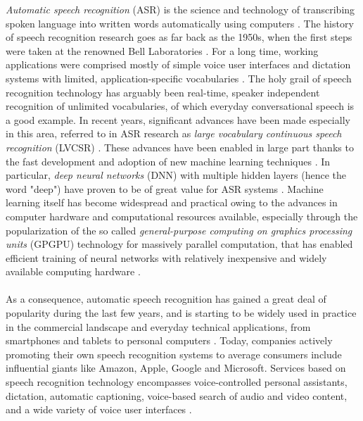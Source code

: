 \documentclass[english, 12pt, a4paper, pdftex, elec, utf8]{aaltothesis}
\begin{document}
\textit{Automatic speech recognition} (ASR) is the science and technology of transcribing spoken language into written words automatically using computers \cite{yu2014automatic, huang2001spoken}. The history of speech recognition research goes as far back as the 1950s, when the first steps were taken at the renowned Bell Laboratories \cite{gales2008application}. For a long time, working applications were comprised mostly of simple voice user interfaces and dictation systems with limited, application-specific vocabularies \cite{yu2014automatic, gales2008application}. The holy grail of speech recognition technology has arguably been real-time, speaker independent recognition of unlimited vocabularies, of which everyday conversational speech is a good example. In recent years, significant advances have been made especially in this area, referred to in ASR research as \textit{large vocabulary continuous speech recognition} (LVCSR) \cite{yu2014automatic, keronen2014approaching}. These advances have been enabled in large part thanks to the fast development and adoption of new machine learning techniques \cite{yu2014automatic, hinton2012deep}. In particular, \textit{deep neural networks} (DNN) with multiple hidden layers (hence the word "deep") have proven to be of great value for ASR systems \cite{yu2014automatic, hinton2012deep}. Machine learning itself has become widespread and practical owing to the advances in computer hardware and computational resources available, especially through the popularization of the so called \textit{general-purpose computing on graphics processing units} (GPGPU) technology for massively parallel computation, that has enabled efficient training of neural networks with relatively inexpensive and widely available computing hardware \cite{yu2014automatic, hinton2012deep}. \\\\
As a consequence, automatic speech recognition has gained a great deal of popularity during the last few years, and is starting to be widely used in practice in the commercial landscape and everyday technical applications, from smartphones and tablets to personal computers \cite{yu2014automatic}. Today, companies actively promoting their own speech recognition systems to average consumers include influential giants like Amazon, Apple, Google and Microsoft. Services based on speech recognition technology encompasses voice-controlled personal assistants, dictation, automatic captioning, voice-based search of audio and video content, and a wide variety of voice user interfaces \cite{yu2014automatic}. \\\\
\end{document}
